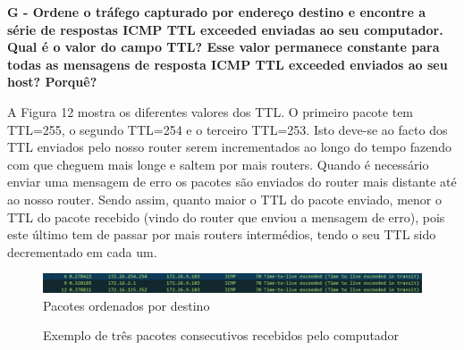 \documentclass[11pt]{article}
\begin{document}
\clearpage

\textbf{G - Ordene o tráfego capturado por endereço destino e encontre a série de respostas ICMP TTL exceeded enviadas ao seu computador. Qual é o valor do campo TTL? Esse valor permanece constante para todas as mensagens de resposta ICMP TTL exceeded enviados ao seu host? Porquê?}

A Figura 12 mostra os diferentes valores dos TTL. O primeiro pacote tem TTL=255, o segundo TTL=254 e o terceiro TTL=253. Isto deve-se ao facto dos TTL enviados pelo nosso router serem incrementados ao longo do tempo fazendo com que cheguem mais longe e saltem por mais routers. Quando é necessário enviar uma mensagem de erro os pacotes são enviados do router mais distante até ao nosso router. Sendo assim, quanto maior o TTL do pacote enviado, menor o TTL do pacote recebido (vindo do router que enviou a mensagem de erro), pois este último tem de passar por mais routers intermédios, tendo o seu TTL sido decrementado em cada um.

\begin{figure}[hbt!]
    \centering
    \includegraphics[width=\textwidth]{images/parte1/default/pacotes_destination.png}
    \caption{Pacotes ordenados por destino}
\end{figure}

\begin{figure}[hbt!]
    \minipage{\textwidth}
        \centering
    \endminipage\hfill
    \vspace{0.2cm}
    \minipage{\textwidth}
        \centering
    \endminipage\hfill
    \vspace{0.2cm}
    \minipage{\textwidth}
        \centering
    \endminipage
    \caption{Exemplo de três pacotes consecutivos recebidos pelo computador}
\end{figure}
\end{document}
